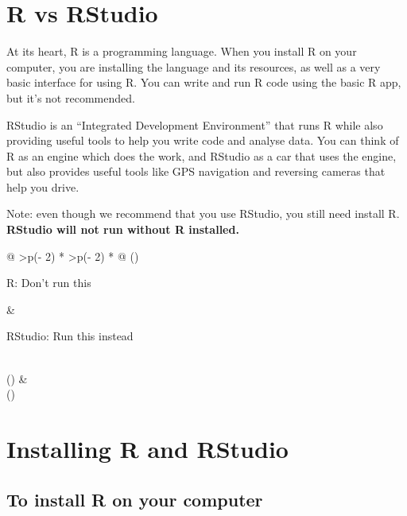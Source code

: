 \documentclass[
]{memoir}
\begin{document}
\hypertarget{r-vs-rstudio}{%
\section{R vs RStudio}\label{r-vs-rstudio}}

At its heart, R is a programming language. When you install R on your computer, you are installing the language and its resources, as well as a very basic interface for using R. You can write and run R code using the basic R app, but it's not recommended.

RStudio is an ``Integrated Development Environment'' that runs R while also providing useful tools to help you write code and analyse data. You can think of R as an engine which does the work, and RStudio as a car that uses the engine, but also provides useful tools like GPS navigation and reversing cameras that help you drive.

Note: even though we recommend that you use RStudio, you still need install R. \textbf{RStudio will not run without R installed.}

\begin{longtable}[]{@{}
  >{\centering\arraybackslash}p{(\columnwidth - 2\tabcolsep) * }
  >{\centering\arraybackslash}p{(\columnwidth - 2\tabcolsep) * }@{}}
\toprule()
\begin{minipage}[b]{\linewidth}\centering
R: Don't run this
\end{minipage} & \begin{minipage}[b]{\linewidth}\centering
RStudio: Run this instead
\end{minipage} \\
\midrule()
\endhead
& \\
\bottomrule()
\end{longtable}

\hypertarget{installing-r-and-rstudio}{%
\section{Installing R and RStudio}\label{installing-r-and-rstudio}}

\hypertarget{to-install-r-on-your-computer}{%
\subsection{To install R on your computer}\label{to-install-r-on-your-computer}}
\end{document}

